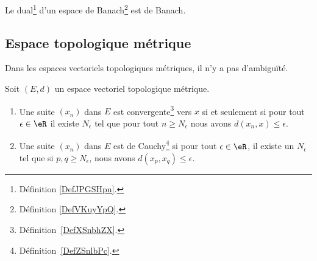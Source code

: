 \begin{proposition}     \label{PROPooOVGGooNffWJW}
	Le dual\footnote{Définition \ref{DefJPGSHpn}.} d'un espace de Banach\footnote{Définition \ref{DefVKuyYpQ}.} est de Banach.
\end{proposition}

\subsection{Espace topologique métrique}

Dans les espaces vectoriels topologiques métriques, il n'y a pas d'ambiguïté.
\begin{proposition}     \label{PropooUEEOooLeIImr}
	Soit \( (E,d)\) un espace vectoriel topologique métrique.
	\begin{enumerate}
		\item   \label{ItemooROYMooAQCXnj}
		      Une suite \( (x_n)\) dans \( E\) est convergente\footnote{Définition~\ref{DefXSnbhZX}.} vers \( x\) si et seulement si pour tout \( \epsilon\in \eR\) il existe \( N_{\epsilon}\) tel que pour tout \( n\geq N_{\epsilon}\) nous avons \( d(x_n,x)\leq \epsilon\).
		\item
		      Une suite \( (x_n)\) dans \( E\) est de Cauchy\footnote{Définition~\ref{DefZSnlbPc}.} si pour tout \( \epsilon\in \eR\), il existe un \( N_{\epsilon}\) tel que si \( p,q\geq N_{\epsilon}\), nous avons \( d(x_p,x_q)\leq \epsilon\).
	\end{enumerate}
\end{proposition}

